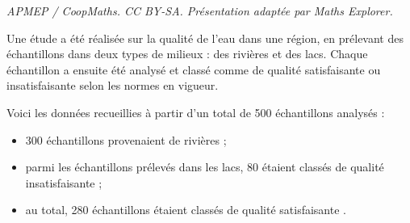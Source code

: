 \documentclass[10pt]{article}
\begin{document}
\noindent\textit{APMEP / CoopMaths. CC BY-SA. Présentation adaptée par Maths Explorer.}\par\medskip
Une étude a été réalisée sur la qualité de l'eau dans une région, en prélevant des échantillons dans deux types de milieux : des rivières et des lacs. Chaque échantillon a ensuite été analysé et classé comme de qualité \og satisfaisante \fg{} ou \og insatisfaisante \fg{} selon les normes en vigueur.

Voici les données recueillies à partir d'un total de 500 échantillons analysés :
\begin{itemize}
	\item 300 échantillons provenaient de rivières ;
	\item parmi les échantillons prélevés dans les lacs, 80 étaient classés de qualité \og insatisfaisante \fg{} ;
	\item au total, 280 échantillons étaient classés de qualité \og satisfaisante \fg.
\end{itemize}
\end{document}

